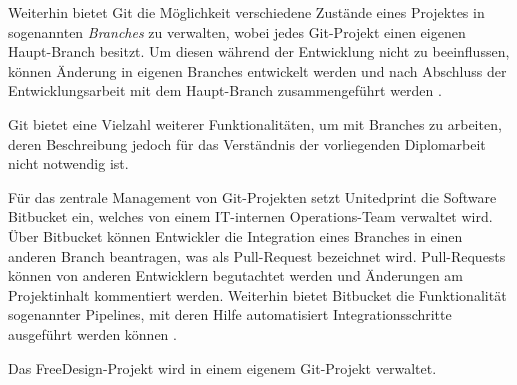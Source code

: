 Weiterhin bietet Git die Möglichkeit verschiedene Zustände eines Projektes in sogenannten \emph{Branches} zu verwalten, wobei jedes Git-Projekt einen eigenen Haupt-Branch besitzt. Um diesen während der 
Entwicklung nicht zu beeinflussen, können Änderung in eigenen Branches entwickelt werden und nach Abschluss der Entwicklungsarbeit mit dem Haupt-Branch zusammengeführt werden \autocite[vgl.][]{Git:Branching}. 

Git bietet eine Vielzahl weiterer Funktionalitäten, um mit Branches zu arbeiten, deren Beschreibung jedoch für das Verständnis der vorliegenden Diplomarbeit nicht notwendig ist. 

Für das zentrale Management von Git-Projekten setzt Unitedprint die Software Bitbucket ein, welches von einem IT-internen Operations-Team verwaltet wird. Über Bitbucket können Entwickler die Integration eines Branches in einen anderen Branch beantragen, was als Pull-Request bezeichnet wird. Pull-Requests können von anderen Entwicklern begutachtet werden und Änderungen am Projektinhalt kommentiert werden. Weiterhin bietet Bitbucket die Funktionalität sogenannter Pipelines, mit deren Hilfe automatisiert Integrationsschritte ausgeführt werden können \autocite[vgl.][]{Bitbucket:Product}.

Das FreeDesign-Projekt wird in einem eigenem Git-Projekt verwaltet.
